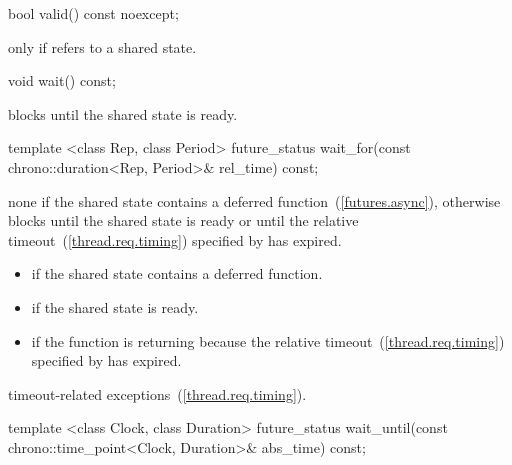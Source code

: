 %
%
\begin{itemdecl}
bool valid() const noexcept;
\end{itemdecl}

\begin{itemdescr}
\pnum
\returns {} only if  refers to a shared state.
\end{itemdescr}

%
%
\begin{itemdecl}
void wait() const;
\end{itemdecl}

\begin{itemdescr}
\pnum
\effects
blocks until the shared state is ready.
\end{itemdescr}

%
%
\begin{itemdecl}
template <class Rep, class Period>
  future_status wait_for(const chrono::duration<Rep, Period>& rel_time) const;
\end{itemdecl}

\begin{itemdescr}
\pnum
\effects
none if the shared state contains a deferred function~(\ref{futures.async}),
otherwise
blocks until the shared state is ready or until
the relative timeout~(\ref{thread.req.timing}) specified by  has expired.

\pnum
\returns

\begin{itemize}
\item {} if the shared state contains a deferred
function.

\item {} if the shared state is ready.

\item {} if the function is returning because the
relative timeout~(\ref{thread.req.timing})
specified by  has expired.
\end{itemize}

\pnum
\throws
timeout-related exceptions~(\ref{thread.req.timing}).
\end{itemdescr}

%
%
\begin{itemdecl}
template <class Clock, class Duration>
  future_status wait_until(const chrono::time_point<Clock, Duration>& abs_time) const;
\end{itemdecl}

